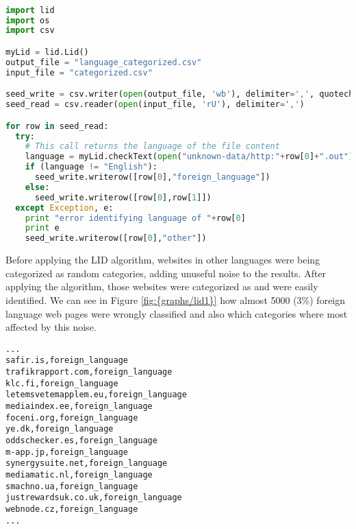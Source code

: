 \begin{lstlisting}[language=Python]

import lid
import os
import csv

myLid = lid.Lid()
output_file = "language_categorized.csv"
input_file = "categorized.csv"

seed_write = csv.writer(open(output_file, 'wb'), delimiter=',', quotechar='|', quoting=csv.QUOTE_MINIMAL)
seed_read = csv.reader(open(input_file, 'rU'), delimiter=',')

for row in seed_read:
  try:
    # This call returns the language of the file content
    language = myLid.checkText(open("unknown-data/http:"+row[0]+".out").read())
    if (language != "English"):
      seed_write.writerow([row[0],"foreign_language"])
    else:
      seed_write.writerow([row[0],row[1]])
  except Exception, e:
    print "error identifying language of "+row[0]
    print e
    seed_write.writerow([row[0],"other"])
\end{lstlisting}

Before applying the LID algorithm, websites in other languages were being categorized as random categories, adding unuseful noise to the results. After applying the algorithm, those websites were 
categorized as  and were easily identified. We can see in Figure \ref{fig:{graphs/lid1}} how almost 5000 (3\%) foreign language web pages were wrongly classified and also which
categories where most affected by this noise.


\begin{lstlisting}
...
safir.is,foreign_language
trafikrapport.com,foreign_language
klc.fi,foreign_language
letemsvetemapplem.eu,foreign_language
mediaindex.ee,foreign_language
foceni.org,foreign_language
ye.dk,foreign_language
oddschecker.es,foreign_language
m-app.jp,foreign_language
synergysuite.net,foreign_language
mediamatic.nl,foreign_language
smachno.ua,foreign_language
justrewardsuk.co.uk,foreign_language
webnode.cz,foreign_language
...
\end{lstlisting}
